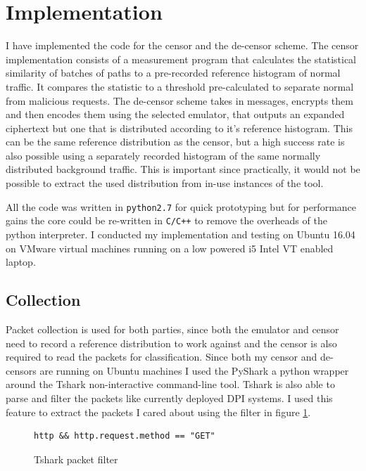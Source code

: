\documentclass[ %
                    author={Samuel Russell},
                supervisor={Prof. Bogdan Warinschi},
                    degree={MEng},
                     title={Innocuous Ciphertexts},
                  subtitle={The DE-CENSOR Scheme},
                      type={research},
                      year={2018} ]{dissertation}
\begin{document}
\section{Implementation}

I have implemented the code for the censor and the de-censor scheme. The censor implementation consists of a measurement program that calculates the statistical similarity of batches of paths to a pre-recorded reference histogram of normal traffic. It compares the statistic to a threshold pre-calculated to separate normal from malicious requests. The de-censor scheme takes in messages, encrypts them and then encodes them using the selected emulator, that outputs an expanded ciphertext but one that is distributed according to it's reference histogram. This can be the same reference distribution as the censor, but a high success rate is also possible using a separately recorded histogram of the same normally distributed background traffic. This is important since practically, it would not be possible to extract the used distribution from in-use instances of the tool.


All the code was written in \texttt{python2.7} for quick prototyping but for performance gains the core could be re-written in \texttt{C/C++} to remove the overheads of the python interpreter. I conducted my implementation and testing on Ubuntu 16.04 on VMware virtual machines running on a low powered i5 Intel VT enabled laptop.

\subsection{Collection}

Packet collection is used for both parties, since both the emulator and censor need to record a reference distribution to work against and the censor is also required to read the packets for classification. Since both my censor and de-censors are running on Ubuntu machines I used the PyShark a python wrapper around the Tshark non-interactive command-line tool. Tshark is also able to parse and filter the packets like currently deployed DPI systems. I used this feature to extract the packets I cared about using the filter in figure \ref{fig:filter}.

\begin{figure}[h]
\begin{verbatim}
http && http.request.method == "GET"
\end{verbatim}
\caption{Tshark packet filter}
\label{fig:filter}
\end{figure}
\end{document}
